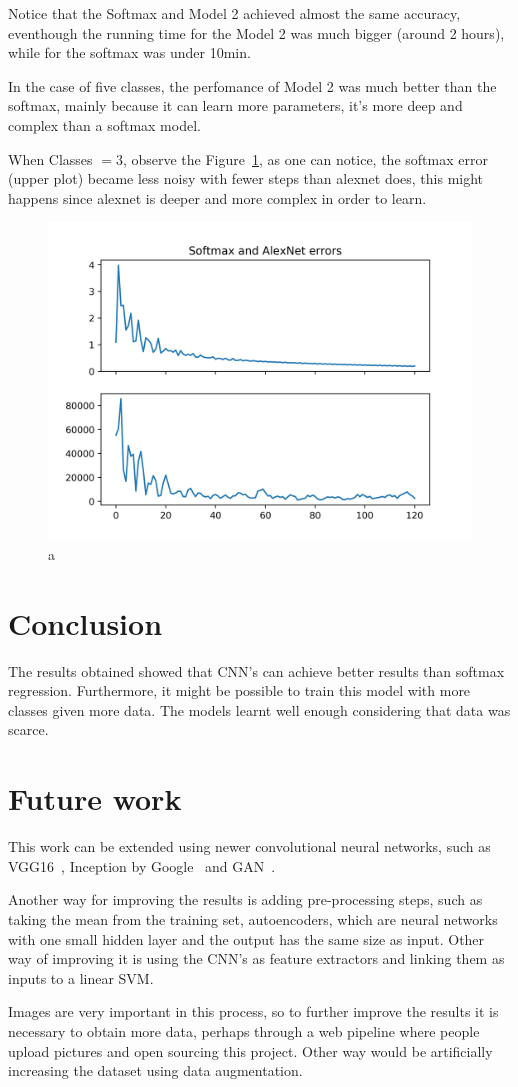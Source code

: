 \documentclass{article}
\begin{document}
  Notice that the Softmax and Model 2 achieved almost the same accuracy, eventhough
  the running time for the Model 2 was much bigger (around 2 hours), while
  for the softmax was under 10min.

  In the case of five classes, the perfomance of Model 2 was much better than the
  softmax, mainly because it can learn more parameters, it's more deep and complex
  than a softmax model.

  When Classes $= 3$, observe the Figure~\ref{fig:errorsoft}, as one can notice,
  the softmax error (upper plot) became less noisy with fewer steps than alexnet does,
  this might happens since alexnet is deeper and more complex in order to learn.
  \begin{figure}
    \centering
    \includegraphics[width=.48\textwidth]{errors.png}
    \caption{a}
    \label{fig:errorsoft}
  \end{figure}

\section{Conclusion}
  The results obtained showed that CNN's can achieve better results than
  softmax regression. Furthermore, it might be possible to train this model
  with more classes given more data. The models learnt well enough
  considering that data was scarce.

\section{Future work}
  This work can be extended using newer convolutional neural networks, such
  as VGG16~\cite{vgg16}, Inception by Google~\cite{inception} and GAN~\cite{
  gan}.

  Another way for improving the results is adding pre-processing steps, such as
  taking the mean from the training set, autoencoders, which are neural networks
  with one small hidden layer and the output has the same size as input. Other
  way of improving it is using the CNN's as feature extractors and linking
  them as inputs to a linear SVM.

  Images are very important in this process, so to further improve the results
  it is necessary to obtain more data, perhaps through a web pipeline where
  people upload pictures and open sourcing this project. Other way would be
  artificially increasing the dataset using data augmentation.



\end{document}
